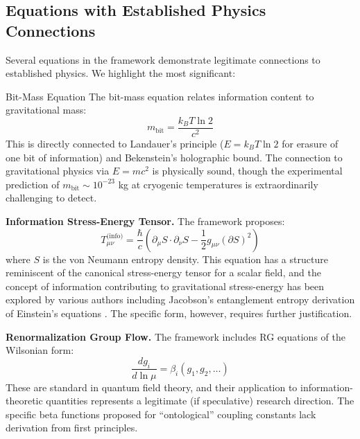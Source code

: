 \documentclass[11pt,a4paper]{article}
\begin{document}
\subsection{Equations with Established Physics Connections}

Several equations in the framework demonstrate legitimate connections to established physics. We highlight the most significant:

\begin{infobox}{Bit-Mass Equation}
The bit-mass equation relates information content to gravitational mass:
\begin{equation}
  m_{\text{bit}} = \frac{k_B T \ln 2}{c^2}
  \label{eq:bit-mass}
\end{equation}
This is directly connected to Landauer's principle ($E = k_B T \ln 2$ for erasure of one bit of information) and Bekenstein's holographic bound. The connection to gravitational physics via $E = mc^2$ is physically sound, though the experimental prediction of $m_{\text{bit}} \sim 10^{-23}$ kg at cryogenic temperatures is extraordinarily challenging to detect.
\end{infobox}

\textbf{Information Stress-Energy Tensor.} The framework proposes:
\begin{equation}
  T_{\mu\nu}^{\text{(info)}} = \frac{\hbar}{c}\left(\partial_\mu S \cdot \partial_\nu S - \frac{1}{2}g_{\mu\nu}(\partial S)^2\right)
  \label{eq:info-stress-energy}
\end{equation}
where $S$ is the von Neumann entropy density. This equation has a structure reminiscent of the canonical stress-energy tensor for a scalar field, and the concept of information contributing to gravitational stress-energy has been explored by various authors including Jacobson's entanglement entropy derivation of Einstein's equations \cite{Jacobson1995}. The specific form, however, requires further justification.

\textbf{Renormalization Group Flow.} The framework includes RG equations of the Wilsonian form:
\begin{equation}
  \frac{dg_i}{d\ln\mu} = \beta_i(g_1, g_2, \ldots)
  \label{eq:rg-flow}
\end{equation}
These are standard in quantum field theory, and their application to information-theoretic quantities represents a legitimate (if speculative) research direction. The specific beta functions proposed for ``ontological'' coupling constants lack derivation from first principles.
\end{document}
